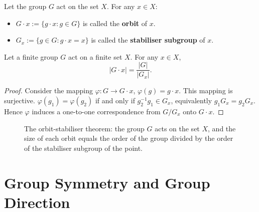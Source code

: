 \begin{definition}\label{def:orbit_stabilizer}
Let the group $G$ act on the set $X$. For any $x \in X$:
\begin{itemize}
    \item $G \cdot x := \{g \cdot x : g \in G\}$ is called the \textbf{orbit} of $x$.
    \item $G_x := \{g \in G : g \cdot x = x\}$ is called the \textbf{stabiliser subgroup} of $x$.
\end{itemize}
\end{definition}

\begin{theorem}\label{thm:orbit_stabilizer}
Let a finite group $G$ act on a finite set $X$. For any $x \in X$,
\[
|G \cdot x| = \frac{|G|}{|G_x|}.
\]
\end{theorem}

\begin{proof}
Consider the mapping $\varphi: G \to G \cdot x$, $\varphi(g) = g \cdot x$. This mapping is surjective. $\varphi(g_1) = \varphi(g_2)$ if and only if $g_2^{-1}g_1 \in G_x$, equivalently $g_1 G_x = g_2 G_x$. Hence $\varphi$ induces a one-to-one correspondence from $G/G_x$ onto $G \cdot x$.
\end{proof}

\begin{figure}[htbp]
\centering
{}
\caption{The orbit-stabiliser theorem: the group $G$ acts on the set $X$, and the size of each orbit equals the order of the group divided by the order of the stabiliser subgroup of the point.}
\label{fig:orbit_stabilizer}
\end{figure}

\section{\texorpdfstring{Group Symmetry and Group Direction}{Group Symmetry and Group Direction}}

